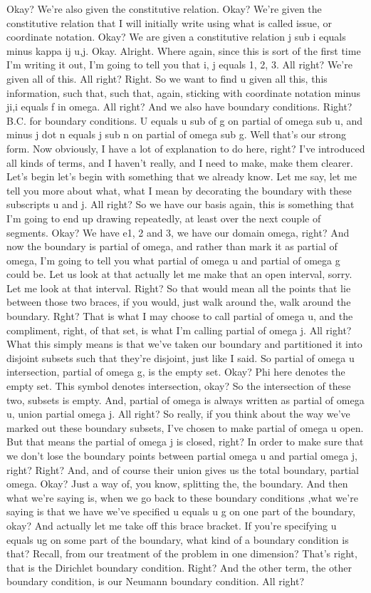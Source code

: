 \documentclass[10pt]{article}
\begin{document}
Okay? We're also given the constitutive relation. Okay? We're given the constitutive relation that I will initially write using what is called issue, or coordinate notation. Okay? We are given a constitutive relation j sub i equals minus kappa ij u,j. Okay. Alright. Where again, since this is sort of the first time I'm writing it out, I'm going to tell you that i, j equals 1, 2, 3. All right? We're given all of this. All right? Right. So we want to find u given all this, this information, such that, such that, again, sticking with coordinate notation minus ji,i equals f in omega. All right? And we also have boundary conditions. Right? B.C. for boundary conditions. U equals u sub of g on partial of omega sub u, and minus j dot n equals j sub n on partial of omega sub g. Well that's our strong form. Now obviously, I have a lot of explanation to do here, right? I've introduced all kinds of terms, and I haven't really, and I need to make, make them clearer. Let's begin let's begin with something that we already know. Let me say, let me tell you more about what, what I mean by decorating the boundary with these subscripts u and j. All right? So we have our basis again, this is something that I'm going to end up drawing repeatedly, at least over the next couple of segments. Okay? We have e1, 2 and 3, we have our domain omega, right? And now the boundary is partial of omega, and rather than mark it as partial of omega, I'm going to tell you what partial of omega u and partial of omega g could be. Let us look at that actually let me make that an open interval, sorry. Let me look at that interval. Right? So that would mean all the points that lie between those two braces, if you would, just walk around the, walk around the boundary. Rght? That is what I may choose to call partial of omega u, and the compliment, right, of that set, is what I'm calling partial of omega j. All right? What this simply means is that we've taken our boundary and partitioned it into disjoint subsets such that they're disjoint, just like I said. So partial of omega u intersection, partial of omega g, is the empty set. Okay? Phi here denotes the empty set. This symbol denotes intersection, okay? So the intersection of these two, subsets is empty. And, partial of omega is always written as partial of omega u, union partial omega j. All right? So really, if you think about the way we've marked out these boundary subsets, I've chosen to make partial of omega u open. But that means the partial of omega j is closed, right? In order to make sure that we don't lose the boundary points between partial omega u and partial omega j, right? Right? And, and of course their union gives us the total boundary, partial omega. Okay? Just a way of, you know, splitting the, the boundary. And then what we're saying is, when we go back to these boundary conditions ,what we're saying is that we have we've specified u equals u g on one part of the boundary, okay? And actually let me take off this brace bracket. If you're specifying u equals ug on some part of the boundary, what kind of a boundary condition is that? Recall, from our treatment of the problem in one dimension? That's right, that is the Dirichlet boundary condition. Right? And the other term, the other boundary condition, is our Neumann boundary condition. All right? 
\end{document}
